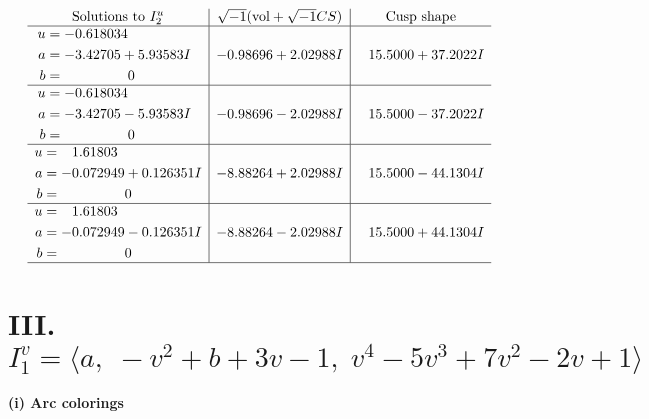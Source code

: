 \documentclass[1p]{elsarticle_modified}
\theoremstyle{definition}
\newcommand{\I}{\sqrt{-1}}
\begin{document}
$$\begin{array}{c|c|c}  
\text{Solutions to }I^u_{2}& \I (\text{vol} + \sqrt{-1}CS) & \text{Cusp shape}\\
 \hline 
\begin{aligned}
u &= -0.618034\phantom{ +0.000000I} \\
a &= -3.42705 + 5.93583 I \\
b &= \phantom{-0.000000 } 0\end{aligned}
 & -0.98696 + 2.02988 I & \phantom{-}15.5000 + 37.2022 I \\ \hline\begin{aligned}
u &= -0.618034\phantom{ +0.000000I} \\
a &= -3.42705 - 5.93583 I \\
b &= \phantom{-0.000000 } 0\end{aligned}
 & -0.98696 - 2.02988 I & \phantom{-}15.5000 - 37.2022 I \\ \hline\begin{aligned}
u &= \phantom{-}1.61803\phantom{ +0.000000I} \\
a &= -0.072949 + 0.126351 I \\
b &= \phantom{-0.000000 } 0\end{aligned}
 & -8.88264 + 2.02988 I & \phantom{-}15.5000 - 44.1304 I \\ \hline\begin{aligned}
u &= \phantom{-}1.61803\phantom{ +0.000000I} \\
a &= -0.072949 - 0.126351 I \\
b &= \phantom{-0.000000 } 0\end{aligned}
 & -8.88264 - 2.02988 I & \phantom{-}15.5000 + 44.1304 I\\
 \hline 
 \end{array}$$\newpage\newpage\renewcommand{\arraystretch}{1}
\centering \section*{III. $I^v_{1}= \langle a,\;- v^2+b+3 v-1,\;v^4-5 v^3+7 v^2-2 v+1 \rangle$}
\flushleft \textbf{(i) Arc colorings}\\
\end{document}

